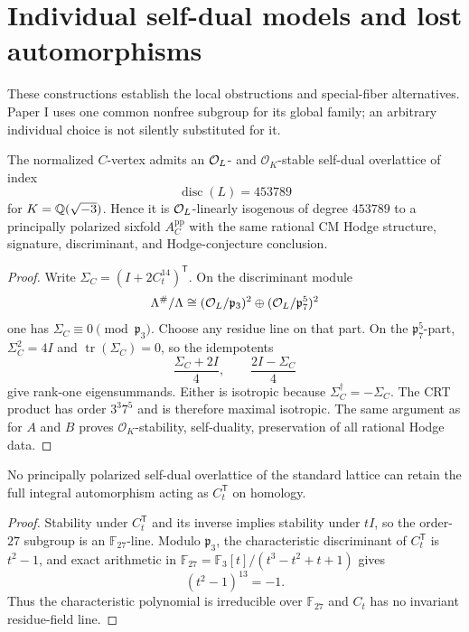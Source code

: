 \section{Individual self-dual models and lost automorphisms}
These constructions establish the local obstructions and special-fiber
alternatives. Paper I uses one common nonfree subgroup for its global
family; an arbitrary individual choice is not silently substituted for it.

\begin{proposition}\label{prop:Cppisogenous}
The normalized $C$-vertex admits an $\mathcal O_L$- and $\mathcal O_K$-stable
self-dual overlattice of index
\[
 \operatorname{disc}(L)=453789
\]
for $K=\mathbb Q(\sqrt{-3})$.  Hence it is $\mathcal O_L$-linearly isogenous of degree
$453789$ to a principally polarized sixfold $A_C^{\mathrm{pp}}$ with the same
rational CM Hodge structure, signature, discriminant, and Hodge-conjecture
conclusion.
\end{proposition}
\begin{proof}
Write $\Sigma_C=(I+2C_t^{14})^{\mathsf T}$.  On the discriminant module
\[
 \Lambda^\#/\Lambda\cong
 (\mathcal O_L/\mathfrak p_3)^2\oplus(\mathcal O_L/\mathfrak p_7^5)^2
\]
one has $\Sigma_C\equiv0\pmod{\mathfrak p_3}$.  Choose any residue line on that
part.  On the $\mathfrak p_7^5$-part, $\Sigma_C^2=4I$ and
$\operatorname{tr}(\Sigma_C)=0$, so the idempotents
\[
 \frac{\Sigma_C+2I}{4},\qquad \frac{2I-\Sigma_C}{4}
\]
give rank-one eigensummands.  Either is isotropic because
$\Sigma_C^\dagger=-\Sigma_C$.  The CRT product has order $3^3 7^5$ and is therefore
maximal isotropic.  The same argument as for $A$ and $B$ proves
$\mathcal O_K$-stability, self-duality, preservation of all rational Hodge
data.
\end{proof}

\begin{corollary}\label{cor:noCstablepp}
No principally polarized self-dual overlattice of the standard lattice can
retain the full integral automorphism acting as $C_t^{\mathsf T}$ on homology.
\end{corollary}
\begin{proof}
Stability under $C_t^{\mathsf T}$ and its inverse implies stability under
$tI$, so the order-$27$ subgroup is an $\mathbb F_{27}$-line. Modulo
$\mathfrak p_3$, the characteristic discriminant of $C_t^{\mathsf T}$ is
$t^2-1$, and exact arithmetic in
$\mathbb F_{27}=\mathbb F_3[t]/(t^3-t^2+t+1)$ gives
\[
 (t^2-1)^{13}=-1.
\]
Thus the characteristic polynomial is irreducible over $\mathbb F_{27}$ and
$C_t$ has no invariant residue-field line.
\end{proof}

